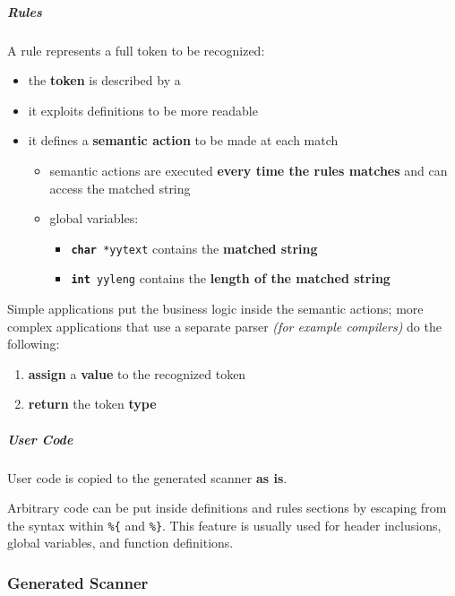 \documentclass[english]{article}
\begin{document}
\subparagraph*{Rules}
A rule represents a full token to be recognized:

\begin{itemize}
  \item the \textbf{token} is described by a \re
  \item it exploits definitions to be more readable
  \item it defines a \textbf{semantic action} to be made at each match
        \begin{itemize}
          \item semantic actions are executed \textbf{every time the rules matches} and can access the matched string
          \item global variables:
                \begin{itemize}[label=\texttt{>}]
                  \item \texttt{\textbf{char} *yytext} contains the \textbf{matched string}
                  \item \texttt{\textbf{int} yyleng} contains the \textbf{length of the matched string}
                \end{itemize}
        \end{itemize}
\end{itemize}

Simple applications put the business logic inside the semantic actions;
more complex applications that use a separate parser \textit{(for example compilers)} do the following:

\begin{enumerate}
  \item \textbf{assign} a \textbf{value} to the recognized token
  \item \textbf{return} the token \textbf{type}
\end{enumerate}

\subparagraph*{User Code}

User \clang code is copied to the generated scanner \textbf{as is}.

Arbitrary code can be put inside definitions and rules sections by escaping from the \flex syntax within \texttt{\%\{} and \texttt{\%\}}.
This feature is usually used for header inclusions, global variables, and function definitions.

\subsubsection{Generated Scanner}
\end{document}
